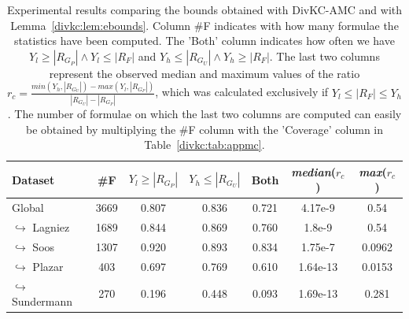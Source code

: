 \documentclass{article}
\newcommand\divkcamc[0]{DivKC-AMC\xspace}
\begin{document}
    
\begin{table}[h!]
        \centering
            \begin{tabular}{l|c|c|c|c|c|c}
                Dataset & \#F & $Y_l \geq |R_{G_P}|$ & $Y_h \leq |R_{G_U}|$ & Both & \textit{median}($r_c$) & \textit{max}($r_c$) \\ 
                \hline 
Global & 3669 & 0.807 & 0.836 & 0.721 & 4.17e-9 & 0.54 \\
$\hookrightarrow$ Lagniez \cite{D4} & 1689 & 0.844 & 0.869 & 0.760 & 1.8e-9 & 0.54 \\
$\hookrightarrow$ Soos \cite{soos_2024_10449477} & 1307 & 0.920 & 0.893 & 0.834 & 1.75e-7 & 0.0962 \\
$\hookrightarrow$ Plazar \cite{Plazar2019} & 403 & 0.697 & 0.769 & 0.610 & 1.64e-13 & 0.0153 \\
$\hookrightarrow$ Sundermann \cite{SBK+:SPLC24} & 270 & 0.196 & 0.448 & 0.093 & 1.69e-13 & 0.281 \\
            \end{tabular}
                \caption{Experimental results comparing the bounds obtained with \divkcamc and with Lemma~\ref{divkc:lem:ebounds}.
        Column \#F indicates with how many formulae the statistics have been computed.
        The 'Both' column indicates how often we have $Y_l \geq |R_{G_P}| \land Y_l \leq |R_F|$
        and $Y_h \leq |R_{G_U}| \land Y_h \geq |R_F|$.
        The last two columns represent the observed median and maximum values of the ratio $r_c = \frac{\textit{min}(Y_h, |R_{G_U}|) - \textit{max}(Y_l, |R_{G_P}|)}{|R_{G_U}| - |R_{G_P}|}$, which was calculated exclusively if $Y_l \leq |R_F| \leq Y_h$.
        The number of formulae on which the last two columns are computed can easily be obtained by multiplying the \#F column with the 'Coverage' column in Table~\ref{divkc:tab:appmc}.
        }
        \label{divkc:tab:coverage}
    \end{table}
\end{document}
